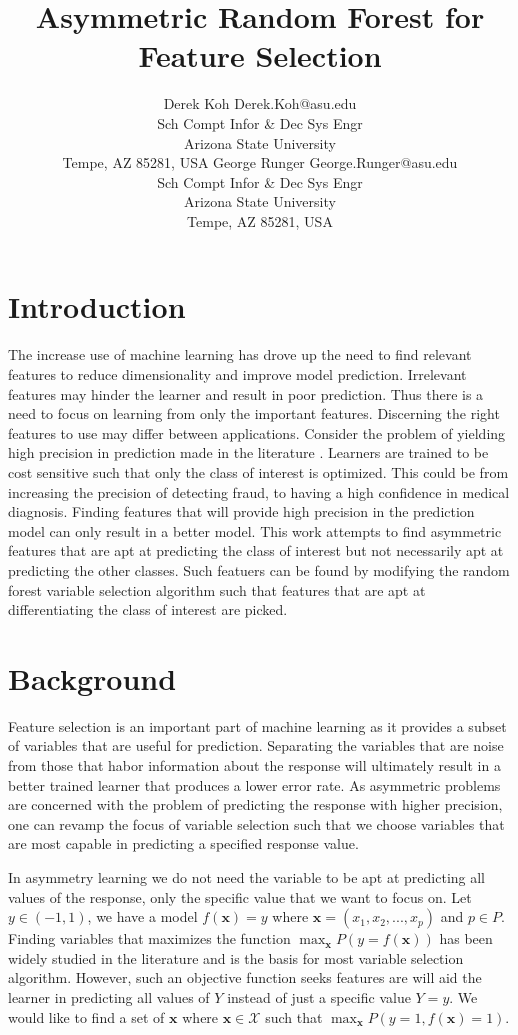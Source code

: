 \documentclass[twoside,11pt]{article}
\title{Asymmetric Random Forest for Feature Selection}
\author{\name Derek Koh \email Derek.Koh@asu.edu \\
       \addr Sch Compt Infor \& Dec Sys Engr\\
       Arizona State University\\
       Tempe, AZ 85281, USA
       \AND
\name George Runger \email George.Runger@asu.edu\\
       \addr Sch Compt Infor \& Dec Sys Engr\\
       Arizona State University\\
       Tempe, AZ 85281, USA
}
\begin{document}
\maketitle

\section{Introduction}
The increase use of machine learning has drove up the need to find relevant features to reduce dimensionality and improve model prediction. Irrelevant features may hinder the learner and result in poor prediction. Thus there is a need to focus on learning from only the important features. Discerning the right features to use may differ between applications. Consider the problem of yielding high precision in prediction made in the literature \citep{Masnadi11}. Learners are trained to be cost sensitive such that only the class of interest is optimized. This could be from increasing the precision of detecting fraud, to having a high confidence in medical diagnosis. Finding features that will provide high precision in the prediction model can only result in a better model. This work attempts to find asymmetric features that are apt at predicting the class of interest but not necessarily apt at predicting the other classes. Such featuers can be found by modifying the random forest variable selection algorithm such that features that are apt at differentiating the class of interest are picked. 

\section{Background}
Feature selection is an important part of machine learning as it provides a subset of variables that are useful for prediction. Separating the variables that are noise from those that habor information about the response will ultimately result in a better trained learner that produces a lower error rate. As asymmetric problems are concerned with the problem of predicting the response with higher precision, one can revamp the focus of variable selection such that we choose variables that are most capable in predicting a specified response value.

In asymmetry learning we do not need the variable to be apt at predicting all values of the response, only the specific value that we want to focus on. Let $y \in (-1,1)$, we have a model $f(\mathbf{x})=y$ where $\mathbf{x} = (x_1,x_2,...,x_p)$ and $p \in P$. Finding variables that maximizes the function $\displaystyle\max_{\mathbf{x}}P(y=f(\mathbf{x}))$ has been widely studied in the literature and is the basis for most variable selection algorithm. However, such an objective function seeks features are will aid the learner in predicting all values of $Y$ instead of just a specific value $Y=y$. We would like to find a set of $\mathbf{x}$ where $\mathbf{x} \in \mathcal{X}$ such that $\displaystyle\max_{\mathbf{x}}P(y=1,f(\mathbf{x})=1)$. 
\end{document}

